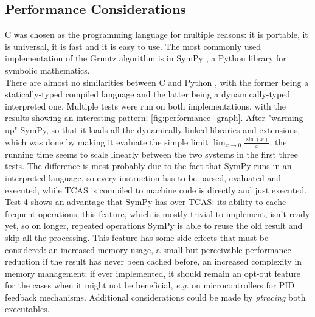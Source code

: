 \documentclass{article}
\theoremstyle{plain}
\theoremstyle{definition}
\theoremstyle{algorithm}
\begin{document}
	
	\subsection{Performance Considerations}
	
	C was chosen as the programming language for multiple reasons: it is portable, it is universal, it is fast and it is easy to use.
	The most commonly used implementation of the Gruntz algorithm is in SymPy \cite{10.7717/peerj-cs.103}, a Python library for symbolic mathematics. \\
	There are almost no similarities between C and Python \cite{book:python}, with the former being a statically-typed \cite{wiki:typesystem} compiled language and the latter being a dynamically-typed \cite{wiki:typesystem} interpreted one. 
	Multiple tests were run on both implementations, with the results showing an interesting pattern: \cref{fig:performance_graph}. After "warming up" SymPy, so that it loads all the dynamically-linked libraries and extensions, which was done by making it evaluate the simple limit \(\lim_{x \to 0}{\frac{\sin(x)}{x}}\), the running time seems to scale linearly between the two systems in the first three tests. The difference is most probably due to the fact that SymPy runs in an interpreted language, so every instruction has to be parsed, evaluated and executed, while TCAS is compiled to machine code is directly and just executed. \\
	Test-4 shows an advantage that SymPy has over TCAS: its ability to cache frequent operations; this feature, which is mostly trivial to implement, isn't ready yet, so on longer, repeated operations SymPy is able to reuse the old result and skip all the processing. This feature has some side-effects that must be considered: an increased memory usage, a small but perceivable performance reduction if the result has never been cached before, an increased complexity in memory management; if ever implemented, it should remain an opt-out feature for the cases when it might not be beneficial, \textit{e.g.} on microcontrollers for PID \cite{wiki:pid} feedback mechanisms.
	Additional considerations could be made by \textit{ptracing} \cite{wiki:ptrace} both executables.
	
	
	\newpage
	\nocite{book:kr}
	\nocite{pdf:gnump}
	\nocite{pdf:mpfr}
	\printbibliography
	
\end{document}
